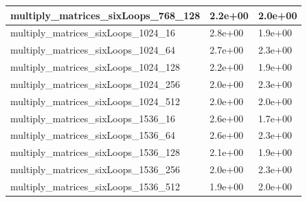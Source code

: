 \documentclass{scrartcl}
\begin{document}
\begin{table}[H]
\begin{tabular}{|l|l|l|}
multiply\_matrices\_sixLoops\_768\_128  & 2.2e+00           & 2.0e+00            \\ \hline
multiply\_matrices\_sixLoops\_1024\_16  & 2.8e+00           & 1.9e+00            \\ \hline
multiply\_matrices\_sixLoops\_1024\_64  & 2.7e+00           & 2.3e+00            \\ \hline
multiply\_matrices\_sixLoops\_1024\_128 & 2.2e+00           & 1.9e+00            \\ \hline
multiply\_matrices\_sixLoops\_1024\_256 & 2.0e+00           & 2.3e+00            \\ \hline
multiply\_matrices\_sixLoops\_1024\_512 & 2.0e+00           & 2.0e+00            \\ \hline
multiply\_matrices\_sixLoops\_1536\_16  & 2.6e+00           & 1.7e+00            \\ \hline
multiply\_matrices\_sixLoops\_1536\_64  & 2.6e+00           & 2.3e+00            \\ \hline
multiply\_matrices\_sixLoops\_1536\_128 & 2.1e+00           & 1.9e+00            \\ \hline
multiply\_matrices\_sixLoops\_1536\_256 & 2.0e+00           & 2.3e+00            \\ \hline
multiply\_matrices\_sixLoops\_1536\_512 & 1.9e+00           & 2.0e+00            \\ \hline
\end{tabular}
\end{table}
\end{document}
